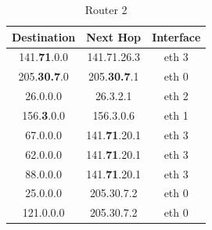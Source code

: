 \documentclass{WeSTassignment}
\begin{document}
\begin{table}[h]
\centering
\caption{Router 2}
\label{Router 2}
\begin{tabular}{ccc}
\hline
\multicolumn{1}{|c|}{\textbf{Destination}} & \multicolumn{1}{c|}{\textbf{Next Hop}} & \multicolumn{1}{c|}{\textbf{Interface}} \\ \hline
141.\textbf{71}.0.0                                  & 141.71.26.3                            & eth 3                                   \\
205.\textbf{30.7}.0                                  & 205.\textbf{30.7}.1                            & eth 0                                   \\
26.0.0.0                                   & 26.3.2.1                               & eth 2                                    \\
156.\textbf{3}.0.0                                  & 156.3.0.6                              & eth 1                                   \\
67.0.0.0                                   & 141.\textbf{71}.20.1                            & eth 3                                   \\
62.0.0.0                                   & 141.\textbf{71}.20.1                            & eth 3                                   \\
88.0.0.0                                   & 141.\textbf{71}.20.1                            & eth 3                                    \\
25.0.0.0                                   & 205.30.7.2                             & eth 0                                   \\
121.0.0.0                                  & 205.30.7.2                             & eth 0                                  
\end{tabular}
\end{table}
\end{document}
